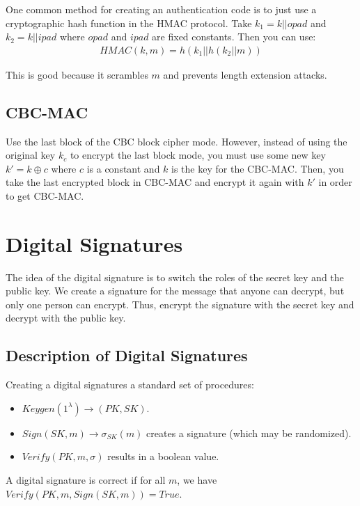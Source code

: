 \documentclass[psamsfonts]{amsart}
\begin{document}
One common method for creating an authentication code is to just use a cryptographic hash function in the HMAC protocol. Take $k_1 = k || opad$ and $k_2 = k || ipad$ where $opad$ and $ipad$ are fixed constants. Then you can use:
\begin{eqnarray}
  HMAC(k, m) = h(k_1 || h(k_2 || m))
\end{eqnarray}

This is good because it scrambles $m$ and prevents length extension attacks.

\subsection{CBC-MAC}

Use the last block of the CBC block cipher mode. However, instead of using the original key $k_c$ to encrypt the last block mode, you must use some new key $k' = k \oplus c$ where $c$ is a constant and $k$ is the key for the CBC-MAC. Then, you take the last encrypted block in CBC-MAC and encrypt it again with $k'$ in order to get CBC-MAC.

\newpage

\section{Digital Signatures}

The idea of the digital signature is to switch the roles of the secret key and the public key. We create a signature for the message that anyone can decrypt, but only one person can encrypt. Thus, encrypt the signature with the secret key and decrypt with the public key.

\subsection{Description of Digital Signatures}

Creating a digital signatures a standard set of procedures:
\begin{itemize}
  \item $Keygen(1^{\lambda}) \to (PK, SK)$.
  \item $Sign(SK, m) \to \sigma_{SK}(m)$ creates a signature (which may be randomized).
  \item $Verify(PK, m, \sigma)$ results in a boolean value.
\end{itemize}

A digital signature is correct if for all $m$, we have $Verify(PK, m, Sign(SK, m)) = True$.
\end{document}

